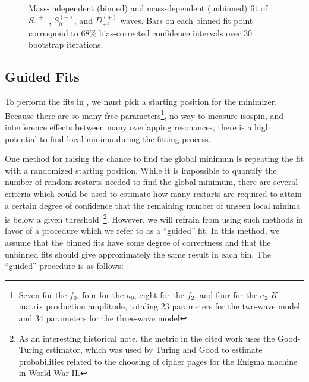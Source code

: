 \begin{figure}
  \begin{center}
    
  \end{center}
  \caption{Mass-independent (binned) and mass-dependent (unbinned) fit of $S_{0}^{(+)}$, $S_{0}^{(-)}$, and $D_{+2}^{(+)}$ waves. Bars on each binned fit point correspond to $68\%$ bias-corrected confidence intervals over $ 30 $ bootstrap iterations.}\label{fig:unbinned-fit-chisqdof-3.0-Spn-D2p}
\end{figure}

\subsection{Guided Fits}\label{sub:guided-fits}

To perform the fits in , we must pick a starting position for the minimizer. Because there are so many free parameters\footnote{Seven for the $f_0$, four for the $a_0$, eight for the $f_2$, and four for the $a_2$ $K$-matrix production amplitude, totaling $23$ parameters for the two-wave model and $34$ parameters for the three-wave model}, no way to measure isospin, and interference effects between many overlapping resonances, there is a high potential to find local minima during the fitting process.

One method for raising the chance to find the global minimum is repeating the fit with a randomized starting position. While it is impossible to quantify the number of random restarts needed to find the global minimum, there are several criteria which could be used to estimate how many restarts are required to attain a certain degree of confidence that the remaining number of unseen local minima is below a given threshold~\cite{Dick2014}\footnote{As an interesting historical note, the metric in the cited work uses the Good-Turing estimator, which was used by Turing and Good to estimate probabilities related to the choosing of cipher pages for the Enigma machine in World War II.}. However, we will refrain from using such methods in favor of a procedure which we refer to as a ``guided'' fit. In this method, we assume that the binned fits have some degree of correctness and that the unbinned fits should give approximately the same result in each bin. The ``guided'' procedure is as follows:

